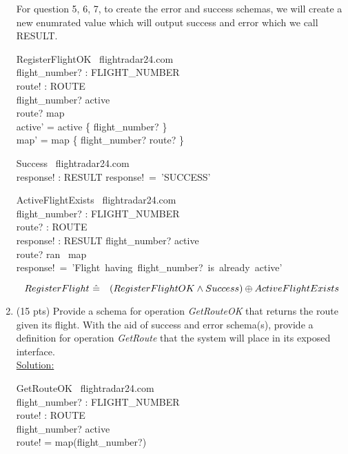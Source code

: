 \documentclass[12pt]{article}
\begin{document}
\begin{enumerate}
For question 5, 6, 7, to create the error and success schemas, we will create a new enumrated value which will output success and error which we call RESULT. 

\begin{schema}{RegisterFlightOK}
\Delta \ flightradar24.com\\
flight\_number? : FLIGHT\_NUMBER\\
route! : ROUTE\\
\where
flight\_number? \notin active\\
route? \notin \ran map\\
active' = active \cup \{ flight\_number? \}\\
map' = map \cup \{ flight\_number? \mapsto route? \}\
\end{schema}

\begin{schema}{Success}
\Xi \ flightradar24.com\\
response! : RESULT
\where
response!~=~'SUCCESS'\\
\end{schema}



\begin{schema}{ActiveFlightExists}
\Xi \ flightradar24.com\\
flight\_number? : FLIGHT\_NUMBER\\
route? : ROUTE \\
response! : RESULT
\ST
flight\_number? \in active\\
route? \in ran \ map \\
response!~=~'Flight~having~flight\_number?~is~already~active'
\end{schema}


\[ RegisterFlight~\hat{=}~\\
~~~(RegisterFlightOK \wedge Success) \oplus ActiveFlightExists \]




\item (15 pts) Provide a schema for operation \emph{GetRouteOK} that returns the route given its
flight. With the aid of success and error schema(s), provide a definition for operation
\emph{GetRoute} that the system will place in its exposed interface. \\
\noindent \underline{Solution:}\\

\begin{schema}{GetRouteOK}
\Xi \ flightradar24.com\\
flight\_number? : FLIGHT\_NUMBER \\
route! : ROUTE\\
\where
flight\_number? \in active\\
route! = map(flight\_number?)
\end{schema}


\end{enumerate}
\end{document}
